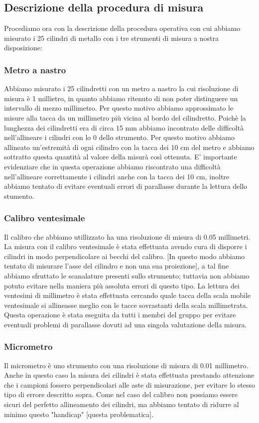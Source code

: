 \documentclass[12pt, twoside, a4paper]{article}
\begin{document}
	\subsection{Descrizione della procedura di misura}
Procediamo ora con la descrizione della procedura operativa con cui abbiamo misurato i 25 cilindri di metallo con i tre strumenti di misura a nostra disposizione:
		\subsubsection{Metro a nastro}
Abbiamo misurato i 25 cilindretti con un metro a nastro la cui risoluzione di misura è 1 millietro, in quanto abbiamo ritenuto di non poter distinguere un intervallo di mezzo millimetro. Per questo motivo abbiamo approssimato le misure alla tacca da un millimetro più vicina al bordo del cilindretto. Poichè la lunghezza dei cilindretti era di circa 15 mm abbiamo incontrato delle difficoltà nell'allineare i cilindri con lo 0 dello strumento. Per questo motivo abbiamo allineato un'estremità di ogni cilindro con la tacca dei 10 cm del metro e abbiamo sottratto questa quantità al valore della misurà così ottenuta. E' importante evidenziare che in questa operazione abbiamo riscontrato una difficoltà nell'allineare correttamente i cilindri anche con la tacca dei 10 cm, inoltre abbiamo tentato di evitare eventuali errori di parallasse durante la lettura dello stumento.
		\subsubsection{Calibro ventesimale}
Il calibro che abbiamo utillizzato ha una risoluzione di misura di 0.05 millimetri. La misura con il calibro ventesimale è stata effettuata avendo cura di disporre i cilindri in modo perpendicolare ai becchi del calibro. [In questo modo abbiamo tentato di misurare l'asse del cilindro e non una sua proiezione], a tal fine abbiamo sfruttato le scanalature presenti sullo strumento; tuttavia non abbiamo potuto evitare nella maniera più assoluta errori di questo tipo.
La lettura dei ventesimi di millimetro è stata effettuata cercando quale tacca della scala mobile ventesimale si allineasse meglio con le tacce sovrastanti della scala millimetrata. Questa operazione è stata eseguita da tutti i membri del gruppo per evitare eventuali problemi di parallasse dovuti ad una singola valutazione della misura.
		\subsubsection{Micrometro}
Il micrometro è uno strumento con una risoluzione di misura di 0.01 millimetro. Anche in questo caso la misura dei cilindri è stata effettuata prestando attenzione che i campioni fossero perpendicolari alle aste di misurazione, per evitare lo stesso tipo di errore descritto sopra. Come nel caso del calibro non possiamo essere sicuri del perfetto allineamento dei cilindri, ma abbiamo tentato di ridurre al minimo questo "handicap" [questa problematica].
\end{document}
